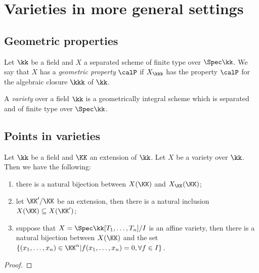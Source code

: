 \section{Varieties in more general settings}

\subsection{Geometric properties}

    \begin{definition}\label{def:geometrically_property}
        Let \(\kk\) be a field and \(X\) a separated scheme of finite type over \(\Spec \kk\).
        We say that \(X\) has a \emph{geometric property} \(\calP\) if \(X_{\kkk}\) has the property \(\calP\) for the algebraic closure \(\kkk\) of \(\kk\).
    \end{definition}

    \begin{definition}\label{def:varieties_over_general_field}
        A \emph{variety} over a field \(\kk\) is a geometrically integral scheme which is separated and of finite type over \(\Spec \kk\).
    \end{definition}


\subsection{Points in varieties}

    \begin{proposition}\label{prop:points_in_varieties_and_extension_of_base_field}
        Let \(\kk\) be a field and \(\KK\) an extension of \(\kk\).
        Let \(X\) be a variety over \(\kk\).
        Then we have the following:
        \begin{enumerate}
            \item there is a natural bijection between \(X(\KK)\) and \(X_\KK(\KK)\);
            \item let \(\KK'/\KK\) be an extension, then there is a natural inclusion \(X(\KK) \subseteq X(\KK')\);
            \item suppose that \(X = \Spec \kk[T_1,\ldots,T_n]/I\) is an affine variety, then there is a natural bijection between \(X(\KK)\) and the set \(\{(x_1,\ldots,x_n) \in \KK^n | f(x_1,\ldots,x_n) = 0, \forall f \in I\}\).
        \end{enumerate}
    \end{proposition}
    \begin{proof}
    \end{proof}

